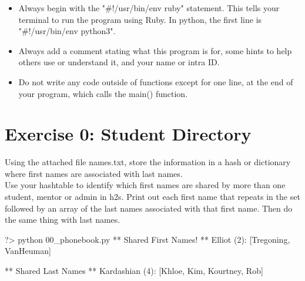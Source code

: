 \documentclass{42-en}
\begin{document}
\begin{itemize}
	\item Always begin with the "\#!/usr/bin/env ruby" statement. This tells your terminal to run the program using Ruby. In python, the first line is "\#!/usr/bin/env python3".
	\item Always add a comment stating what this program is for, some hints to help others use or understand it, and your name or intra ID.
	\item Do not write any code outside of functions except for one line, at the end of your program, which calls the main() function.
\end{itemize}

\startexercices


\chapter{Exercise 0: Student Directory}

\makeheaderfiles

Using the attached file names.txt, store the information in a hash or dictionary where first names are associated with last names.\\

Use your hashtable to identify which first names are shared by more than one student, mentor or admin in h2s. Print out each first name that repeats in the set followed by an array of the last names associated with that first name. Then do the same thing with last names.

\begin{42console}
	?> python 00_phonebook.py
	** Shared First Names! **
	Elliot (2): [Tregoning, VanHeuman]

	** Shared Last Names **
	Kardashian (4): [Khloe, Kim, Kourtney, Rob]
\end{42console}
\end{document}
